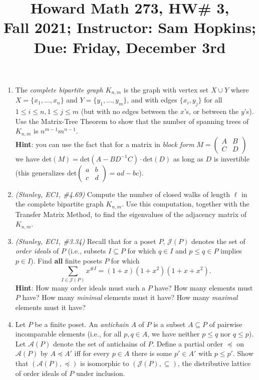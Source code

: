 \documentclass[11pt]{article}
\title{Howard Math 273, HW\# 3, \\ {\normalsize Fall 2021; Instructor: Sam Hopkins; Due: Friday, December 3rd}}
\date{}
\begin{document}
\maketitle

\thispagestyle{empty}

\vspace{-1cm}

\begin{enumerate}

\item The \emph{complete bipartite graph $K_{n,m}$} is the graph with vertex set $X\cup Y$ where $X=\{x_1,...,x_n\}$ and $Y=\{y_1,...,y_m\}$, and with edges $\{x_i,y_j\}$ for all $1\leq i \leq n, 1\leq j \leq m$ (but with no edges between the $x$'s, or between the $y$'s). Use the Matrix-Tree Theorem to show that the number of spanning trees of $K_{n,m}$ is $n^{m-1}m^{n-1}$. \\
{\bf Hint}: you can use the fact that for a matrix in \emph{block form} $M=\begin{pmatrix} A & B \\ C & D \end{pmatrix}$ we have $\mathrm{det}(M) = \mathrm{det}(A-BD^{-1}C)\cdot\mathrm{det}(D)$ as long as $D$ is invertible (this generalizes $\mathrm{det}\begin{pmatrix} a & b \\ c & d\end{pmatrix}=ad-bc$).

\item  \emph{(Stanley, EC1, \#4.69)} Compute the number of closed walks of length $\ell$ in the complete bipartite graph $K_{n,m}$. Use this computation, together with the Transfer Matrix Method, to find the eigenvalues of the adjacency matrix of $K_{n,m}$.

\item \emph{(Stanley, EC1, \#3.34)} Recall that for a poset $P$, $\mathcal{J}(P)$ denotes the set of \emph{order ideals} of $P$ (i.e., subsets $I\subseteq P$ for which $q\in I$ and $p\leq q\in P$ implies $p\in I$). Find {\bf all} finite posets $P$ for which
\[ \sum_{I \in \mathcal{J}(P)} x^{\#I} = (1+x)(1+x^2)(1+x+x^2).\]
{\bf Hint}: How many order ideals must such a $P$ have? How many elements must $P$ have? How many \emph{minimal} elements must it have? How many \emph{maximal} elements must it have?

\item Let $P$ be a finite poset. An \emph{antichain} $A$ of $P$ is a subset $A\subseteq P$ of pairwise incomparable elements (i.e., for all $p,q\in A$, we have neither $p\leq q$ nor $q \leq p$). Let $\mathcal{A}(P)$ denote the set of antichains of $P$. Define a partial order $\preceq$ on $\mathcal{A}(P)$ by $A \preceq A'$ iff for every $p \in A$ there is some $p'\in A'$ with $p \leq p'$. Show that $(\mathcal{A}(P),\preceq)$ is isomorphic to $(\mathcal{J}(P),\subseteq)$, the distributive lattice of order ideals of $P$ under inclusion.


\end{enumerate}
\end{document}
